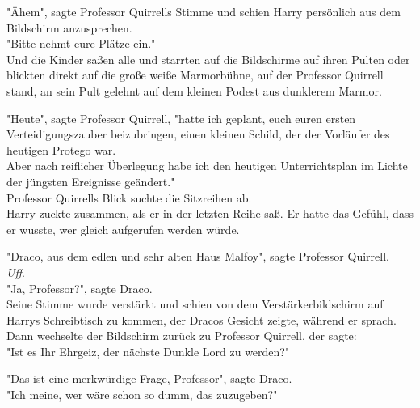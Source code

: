 {"Ähem", sagte Professor Quirrells Stimme und schien Harry persönlich aus dem Bildschirm anzusprechen.\\ "Bitte nehmt eure Plätze ein."\\ Und die Kinder saßen alle und starrten auf die Bildschirme auf ihren Pulten oder blickten direkt auf die große weiße Marmorbühne, auf der Professor Quirrell stand, an sein Pult gelehnt auf dem kleinen Podest aus dunklerem Marmor.

"Heute", sagte Professor Quirrell, "hatte ich geplant, euch euren ersten Verteidigungszauber beizubringen, einen kleinen Schild, der der Vorläufer des heutigen Protego war.\\ Aber nach reiflicher Überlegung habe ich den heutigen Unterrichtsplan im Lichte der jüngsten Ereignisse geändert."\\ Professor Quirrells Blick suchte die Sitzreihen ab.\\ Harry zuckte zusammen, als er in der letzten Reihe saß. Er hatte das Gefühl, dass er wusste, wer gleich aufgerufen werden würde.

"Draco, aus dem edlen und sehr alten Haus Malfoy", sagte Professor Quirrell.\\ \emph{Uff}.\\ "Ja, Professor?", sagte Draco.\\ Seine Stimme wurde verstärkt und schien von dem Verstärkerbildschirm auf Harrys Schreibtisch zu kommen, der Dracos Gesicht zeigte, während er sprach. Dann wechselte der Bildschirm zurück zu Professor Quirrell, der sagte:\\ "Ist es Ihr Ehrgeiz, der nächste Dunkle Lord zu werden?"

"Das ist eine merkwürdige Frage, Professor", sagte Draco.\\ "Ich meine, wer wäre schon so dumm, das zuzugeben?"

}
